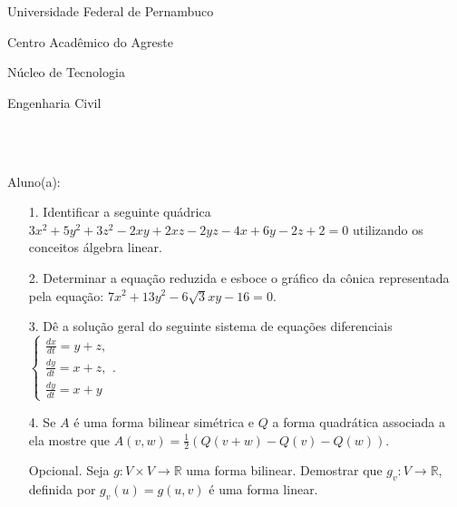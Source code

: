 \documentclass[oneside,a4paper,12pt]{article}
\newcommand{\universidade}{Universidade Federal de Pernambuco}
\newcommand{\centro}{Centro Acadêmico do Agreste}
\newcommand{\departamento}{Núcleo de Tecnologia}
\newcommand{\curso}{Engenharia Civil}
\begin{document}
  \vspace{12pt}
  
     \begin{center}
     	\vspace{0pt}
     	
     	\universidade
     	\par
     	\centro
     	\par
     	\departamento
     	\par
     	\curso
     	\par
     	\vspace{08pt}
     	\\ \\
     \end{center}
     
     \begin{flushleft}
     	Aluno(a):
     \end{flushleft}
 
 \begin{itemize}
 	\item[1.] Identificar a seguinte quádrica $3x^{2}+5y^{2}+3z^{2}-2xy+2xz-2yz-4x+6y-2z+2=0$ utilizando os conceitos álgebra linear.
 \end{itemize}
 \begin{itemize}
 	\item[2.] Determinar a equação reduzida e esboce o gráfico da cônica representada pela equação: $7x^{2}+13y^{2}-6\sqrt{3}xy-16=0$.
 \end{itemize}
 \begin{itemize}
 	\item [3.] Dê a solução geral do seguinte sistema de equações diferenciais
 	$\begin{cases}
 	\frac{dx}{dt}=y+z,\\
 	\frac{dy}{dt}=x+z,\\
 	\frac{dy}{dt}=x+y
 	\end{cases}$.
 \end{itemize}
 \begin{itemize}
 	\item[4.]  Se $A$ é uma forma bilinear simétrica e $Q$ a forma quadrática associada a ela mostre que $A(v,w)=\frac{1}{2}(Q(v+w)-Q(v)- Q(w))$.
 	
 \end{itemize}
\begin{itemize}
	\item[Opcional.] Seja  $g:V\times V \longrightarrow \mathbb{R}$ uma forma bilinear. Demostrar que $g_{v}: V \longrightarrow \mathbb{R} $, definida por $g_{v}(u)=g(u,v)$ é uma forma linear.
	
\end{itemize}
\end{document}
